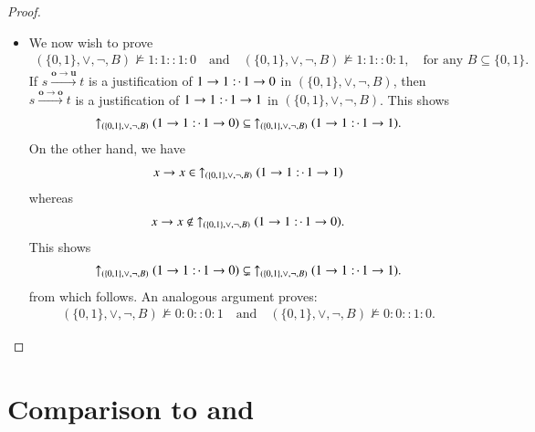 \documentclass[11pt]{amsart}
\theoremstyle{definition} %
\newcommand{\righttherefore}{:\joinrel\cdot\,}
\begin{document}
\begin{proof}
\begin{itemize}
	\item We now wish to prove
	\begin{align}\label{equ:lor_neg_1110_1101} 
		(\{0,1\},\lor,\neg,B)\not\models 1:1::1:0 \quad\text{and}\quad (\{0,1\},\lor,\neg,B)\not\models 1:1::0:1,\quad\text{for any $B\subseteq\{0,1\}$}. 
	\end{align} If $s\xrightarrow{\mathbf o\to\mathbf u} t$ is a justification of $1\to 1\righttherefore 1\to 0$ in $(\{0,1\},\lor,\neg,B)$, then $s\xrightarrow{\mathbf o\to\mathbf o} t$ is a justification of $1\to 1\righttherefore 1\to 1$ in $(\{0,1\},\lor,\neg,B)$. This shows
	\begin{align*} 
		\uparrow_{(\{0,1\},\lor,\neg,B)}(1\to 1\righttherefore 1\to 0)\subseteq\ \uparrow_{(\{0,1\},\lor,\neg,B)}(1\to 1\righttherefore 1\to 1).
	\end{align*} On the other hand, we have
	\begin{align*} 
		x\to x\in\ \uparrow_{(\{0,1\},\lor,\neg,B)}(1\to 1\righttherefore 1\to 1)
	\end{align*} whereas
	\begin{align*} 
		x\to x\not\in\ \uparrow_{(\{0,1\},\lor,\neg,B)}(1\to 1\righttherefore 1\to 0).
	\end{align*} This shows
	\begin{align*} 
		\uparrow_{(\{0,1\},\lor,\neg,B)}(1\to 1\righttherefore 1\to 0)\subsetneq\ \uparrow_{(\{0,1\},\lor,\neg,B)}(1\to 1\righttherefore 1\to 1).
	\end{align*} from which  follows. An analogous argument proves:
	\begin{align}\label{equ:lor_neg_0001_0010} 
		(\{0,1\},\lor,\neg,B)\not\models 0:0::0:1 \quad\text{and}\quad (\{0,1\},\lor,\neg,B)\not\models 0:0::1:0.
	\end{align}
\end{itemize}

\end{proof}

\section{Comparison to  and }\label{§:Comparison}
\end{document}
